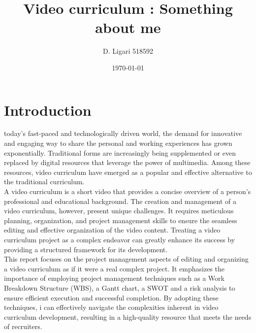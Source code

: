 \documentclass[eng]{class}
\title{Video curriculum : Something about me}
\author{D. Ligari 518592}
\affil{Digital content retrieval, University of Pavia, Department of Computer Engineering (Data Science), Pavia, Italy}
\date{\today}
\begin{document}
\maketitle
\tableofcontents
\thispagestyle{FirstPage}
\section{Introduction}
today's fast-paced and technologically driven world, the demand for innovative and engaging way to share the personal and working experiences has grown exponentially.
Traditional forms are increasingly being supplemented or even replaced by digital resources that leverage the power of multimedia.
Among these resources, video curriculum have emerged as a popular and effective alternative to the traditional curriculum.\\
A video curriculum is a short video that provides a concise overview of a person's professional and educational background.
The creation and management of a video curriculum, however, present unique challenges.
It requires meticulous planning, organization, and project management skills to ensure the seamless editing and effective organization of the video content.
Treating a video curriculum project as a complex endeavor can greatly enhance its success by providing a structured framework for its development.\\
This report focuses on the project management aspects of editing and organizing a video curriculum as if it were a real complex project.
It emphasizes the importance of employing project management techniques such as a Work Breakdown Structure (WBS), a Gantt chart,
a SWOT and a risk analysis to ensure efficient execution and successful completion. By adopting these techniques,
i can effectively navigate the complexities inherent in video curriculum development,
resulting in a high-quality resource that meets the needs of recruiters.
\end{document}
